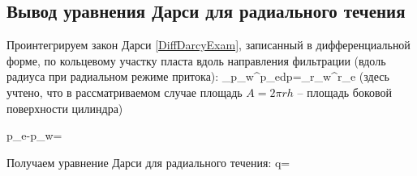 

\subsection{Вывод уравнения Дарси для радиального течения}

Проинтегрируем закон Дарси \eqref{DiffDarcyExam}, записанный в дифференциальной форме, по кольцевому участку пласта вдоль направления фильтрации (вдоль радиуса при радиальном режиме притока):
\beq
\int\limits_{p_w}^{p_e}dp=\int\limits_{r_w}^{r_e}
\eeq
(здесь учтено, что в рассматриваемом случае площадь $A=2\pi r h$ -- площадь боковой поверхности цилиндра)

\beq
p_e-p_w=\ln{}
\eeq

Получаем уравнение Дарси для радиального течения:
\beq
q=
\eeq

